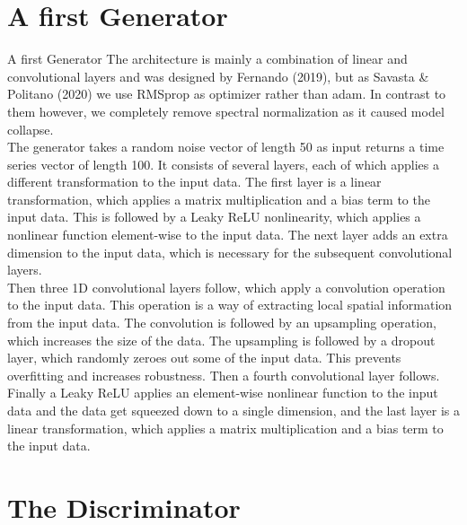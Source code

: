 \documentclass{article}
\begin{document}
\section{A first Generator}
A first Generator
The architecture is mainly a combination of linear and convolutional layers and was designed by Fernando (2019), but as Savasta \& Politano (2020) we use RMSprop as optimizer rather than adam. In contrast to them however, we completely remove spectral normalization as it caused model collapse. \\
The generator takes a random noise vector of length 50 as input returns a time series vector of length 100. It consists of several layers, each of which applies a different transformation to the input data. The first layer is a linear transformation, which applies a matrix multiplication and a bias term to the input data. This is followed by a Leaky ReLU nonlinearity, which applies a nonlinear function element-wise to the input data. The next layer adds an extra dimension to the input data, which is necessary for the subsequent convolutional layers. \\
Then three 1D convolutional layers follow, which apply a convolution operation to the input data. This operation is a way of extracting local spatial information from the input data. The convolution is followed by an upsampling operation, which increases the size of the data. The upsampling is followed by a dropout layer, which randomly zeroes out some of the input data. This prevents overfitting and increases robustness. Then a fourth convolutional layer follows. \\
Finally a Leaky ReLU applies an element-wise nonlinear function to the input data and the data get squeezed down to a single dimension, and the last layer is a linear transformation, which applies a matrix multiplication and a bias term to the input data.

\section{The Discriminator}
    \begin{multicols}{2}
    
    \end{multicols}
\end{document}
